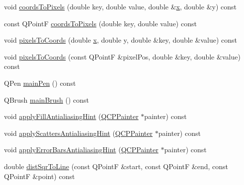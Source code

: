 \begin{DoxyCompactItemize}
\item 
void \hyperlink{classQCPAbstractPlottable_ade710a776104b14c1c835168ce1bfc5c}{coords\+To\+Pixels} (double key, double value, double \&\hyperlink{qualification__task_8cpp_a6150e0515f7202e2fb518f7206ed97dc}{x}, double \&y) const 
\item 
const Q\+PointF \hyperlink{classQCPAbstractPlottable_a9fd1c9df8391781f05b0be22fbe91e13}{coords\+To\+Pixels} (double key, double value) const 
\item 
void \hyperlink{classQCPAbstractPlottable_a10408828446e9e0681c46d65120f382e}{pixels\+To\+Coords} (double \hyperlink{qualification__task_8cpp_a6150e0515f7202e2fb518f7206ed97dc}{x}, double y, double \&key, double \&value) const 
\item 
void \hyperlink{classQCPAbstractPlottable_a3e2c361cfcdfd5d803ada4d333a07e15}{pixels\+To\+Coords} (const Q\+PointF \&pixel\+Pos, double \&key, double \&value) const 
\item 
Q\+Pen \hyperlink{classQCPAbstractPlottable_a19276ed2382a3a06464417b8788b1451}{main\+Pen} () const 
\item 
Q\+Brush \hyperlink{classQCPAbstractPlottable_ae74c123832da180c17e22203e748d9b7}{main\+Brush} () const 
\item 
void \hyperlink{classQCPAbstractPlottable_ac08a480155895e674dbfe5a5670e0ff3}{apply\+Fill\+Antialiasing\+Hint} (\hyperlink{classQCPPainter}{Q\+C\+P\+Painter} $\ast$painter) const 
\item 
void \hyperlink{classQCPAbstractPlottable_a753272ee225a62827e90c3e1e78de4b1}{apply\+Scatters\+Antialiasing\+Hint} (\hyperlink{classQCPPainter}{Q\+C\+P\+Painter} $\ast$painter) const 
\item 
void \hyperlink{classQCPAbstractPlottable_af687bfe6160255960558eb71f1f81e73}{apply\+Error\+Bars\+Antialiasing\+Hint} (\hyperlink{classQCPPainter}{Q\+C\+P\+Painter} $\ast$painter) const 
\item 
double \hyperlink{classQCPAbstractPlottable_a5ea1cab44ca912dcdc96ed81ec5bed5d}{dist\+Sqr\+To\+Line} (const Q\+PointF \&start, const Q\+PointF \&end, const Q\+PointF \&point) const 
\end{DoxyCompactItemize}
